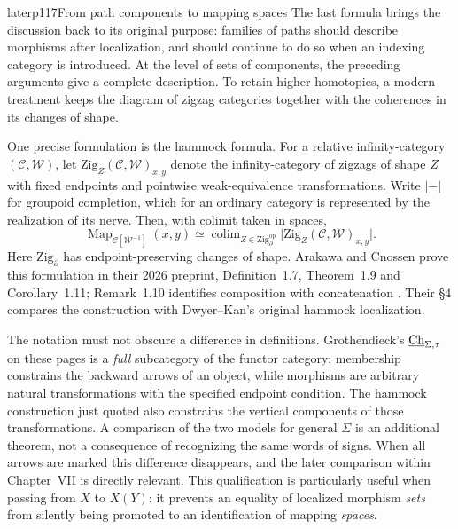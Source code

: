 \begin{dcomment}{later}{p117}{From path components to mapping spaces}
The last formula brings the discussion back to its original purpose: families of paths should describe morphisms after localization, and should continue to do so when an indexing category is introduced.  At the level of sets of components, the preceding arguments give a complete description.  To retain higher homotopies, a modern treatment keeps the diagram of zigzag categories together with the coherences in its changes of shape.

One precise formulation is the hammock formula.  For a relative infinity-category $(\mathcal C,\mathcal W)$, let $\mathrm{Zig}_{Z}(\mathcal C,\mathcal W)_{x,y}$ denote the infinity-category of zigzags of shape $Z$ with fixed endpoints and pointwise weak-equivalence transformations.  Write $|{-}|$ for groupoid completion, which for an ordinary category is represented by the realization of its nerve.  Then, with colimit taken in spaces,
\[
 \operatorname{Map}_{\mathcal C[\mathcal W^{-1}]}(x,y)
 \simeq
 \mathop{\operatorname{colim}}_{Z\in\mathrm{Zig}_{\partial}^{\mathrm{op}}}
 \bigl|\mathrm{Zig}_{Z}(\mathcal C,\mathcal W)_{x,y}\bigr|.
\]
Here $\mathrm{Zig}_{\partial}$ has endpoint-preserving changes of shape.  Arakawa and Cnossen prove this formulation in their 2026 preprint, Definition~1.7, Theorem~1.9 and Corollary~1.11; Remark~1.10 identifies composition with concatenation \citep{ArakawaCnossen2026}.  Their \S4 compares the construction with Dwyer--Kan's original hammock localization.

The notation must not obscure a difference in definitions.  Grothendieck's $\underline{\mathrm{Ch}}_{\Sigma,\tau}$ on these pages is a \emph{full} subcategory of the functor category: membership constrains the backward arrows of an object, while morphisms are arbitrary natural transformations with the specified endpoint condition.  The hammock construction just quoted also constrains the vertical components of those transformations.  A comparison of the two models for general $\Sigma$ is an additional theorem, not a consequence of recognizing the same words of signs.  When all arrows are marked this difference disappears, and the later comparison within Chapter~VII is directly relevant.  This qualification is particularly useful when passing from $X$ to $X(Y)$: it prevents an equality of localized morphism \emph{sets} from silently being promoted to an identification of mapping \emph{spaces}.
\end{dcomment}


